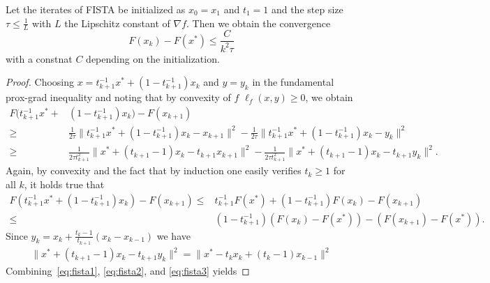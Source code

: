 \begin{theorem}
    Let the iterates of FISTA be initialized as $x_0=x_1$ and $t_1=1$ and the step size $\tau\leq \frac{1}{L}$ with $L$ the Lipschitz constant of $\nabla f$. Then we obtain the convergence 
    \begin{equation}
        F(x_k) - F(x^*)\leq \frac{C}{k^2 \tau}
    \end{equation}
    with a constnat $C$ depending on the initialization.
\end{theorem}
\begin{proof}
    Choosing $x = t_{k+1}^{-1}x^* + (1-t_{k+1}^{-1})x_k$ and $y=y_k$ in the fundamental prox-grad inequality and noting that by convexity of $f$ $\ell_f(x,y)\geq 0$, we obtain
    \begin{equation}\label{eq:fista1}
        \begin{aligned}
            F(t_{k+1}^{-1}x^* + &(1-t_{k+1}^{-1})x_k) - F(x_{k+1})\\
            \geq& \frac{1}{2\tau}\|t_{k+1}^{-1}x^* + (1-t_{k+1}^{-1})x_k-x_{k+1}\|^2 - \frac{1}{2\tau}\|t_{k+1}^{-1}x^* + (1-t_{k+1}^{-1})x_k-y_k\|^2\\
            \geq& \frac{1}{2\tau t_{k+1}^2}\|x^* + (t_{k+1}-1)x_k-t_{k+1} x_{k+1}\|^2 - \frac{1}{2\tau t_{k+1}^2}\|x^* + (t_{k+1}-1)x_k-t_{k+1}y_k\|^2.
        \end{aligned}
    \end{equation}
    Again, by convexity and the fact that by induction one easily verifies $t_k\geq 1$ for all $k$, it holds true that
    \begin{equation}\label{eq:fista2}
        \begin{aligned}
            F(t_{k+1}^{-1}x^* + (1-t_{k+1}^{-1})x_k) - F(x_{k+1})
            \leq& t_{k+1}^{-1} F(x^*) + (1-t_{k+1}^{-1}) F(x_k) - F(x_{k+1})\\
            \leq& (1-t_{k+1}^{-1}) (F(x_k)-F(x^*)) - (F(x_{k+1})-F(x^*)).
        \end{aligned}
    \end{equation}
    Since $y_k = x_k + \frac{t_k-1}{t_{k+1}}(x_k-x_{k-1})$ we have
    \begin{equation}\label{eq:fista3}
        \begin{aligned}
            \|x^* + (t_{k+1}-1)x_k-t_{k+1}y_k\|^2
            = \|x^* - t_k x_k + (t_k-1)x_{k-1}\|^2
        \end{aligned}
    \end{equation}
    Combining~\eqref{eq:fista1}, \eqref{eq:fista2}, and \eqref{eq:fista3} yields

\end{proof}
